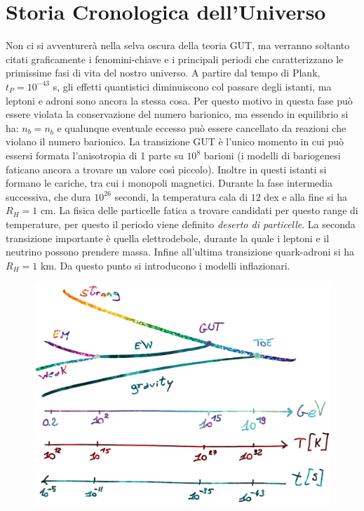 \chapter{Storia Cronologica dell'Universo}\label{5:ch}

Non ci si avventurerà nella selva oscura della teoria GUT, ma verranno soltanto citati graficamente i fenomini-chiave e i principali periodi che caratterizzano le primissime fasi di vita del nostro universo. A partire dal tempo di Plank, $t_P=10^{-43}$ s, gli effetti quantistici diminuiscono col passare degli istanti, ma leptoni e adroni sono ancora la stessa cosa. Per questo motivo in questa fase può essere violata la conservazione del numero barionico, ma essendo in equilibrio si ha: $n_b = n_{\overbar{b}}$ e qualunque eventuale eccesso può essere cancellato da reazioni che violano il numero barionico. La transizione GUT è l'unico momento in cui può essersi formata l'anisotropia di 1 parte su $10^8$ barioni (i modelli di bariogenesi faticano ancora a trovare un valore così piccolo). Inoltre in questi istanti si formano le cariche, tra cui i monopoli magnetici. Durante la fase intermedia successiva, che dura $10^{26}$ secondi, la temperatura cala di $12$ dex e alla fine si ha $R_H = 1$ cm. La fisica delle particelle fatica a trovare candidati per questo range di temperature, per questo il periodo viene definito \textit{deserto di particelle}. La seconda transizione importante è quella elettrodebole, durante la quale i leptoni e il neutrino possono prendere massa. Infine all'ultima transizione quark-adroni si ha $R_H = 1$ km. Da questo punto si introducono i modelli inflazionari.
\begin{figure}[H]
    \centering
    \includegraphics[width=.55 \textwidth]{Pictures/5/fasiprimordiali.png}
    \label{fig:4}
\end{figure}


